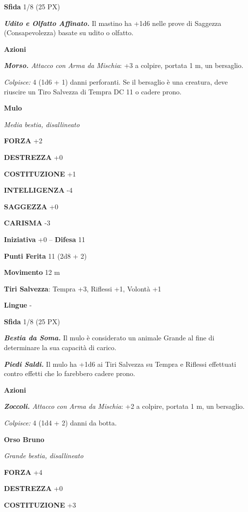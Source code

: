 \begin{multicols}{2}
	\textbf{Sfida} 1/8 (25 PX)

	\textit{\textbf{Udito e Olfatto Affinato.}} Il mastino ha +1d6 nelle prove di Saggezza (Consapevolezza) basate su udito o olfatto.

	\textbf{Azioni}

	\textit{\textbf{Morso.} Attacco con Arma da Mischia}: +3 a colpire, portata 1 m, un bersaglio.

	\textit{Colpisce:} 4 (1d6 + 1) danni perforanti. Se il bersaglio è una creatura, deve riuscire un Tiro Salvezza di Tempra DC 11 o cadere prono.

	\medskip\textbf{Mulo}

	\textit{Media bestia, disallineato}

	\textbf{FORZA} +2

	\textbf{DESTREZZA} +0

	\textbf{COSTITUZIONE} +1

	\textbf{INTELLIGENZA} -4

	\textbf{SAGGEZZA} +0

	\textbf{CARISMA} -3

	\textbf{Iniziativa} +0 -- \textbf{Difesa} 11

	\textbf{Punti Ferita} 11 (2d8 + 2)

	\textbf{Movimento} 12 m

	\textbf{Tiri Salvezza}: Tempra +3, Riflessi +1, Volontà +1

	\textbf{Lingue} -

	\textbf{Sfida} 1/8 (25 PX)

	\textit{\textbf{Bestia da Soma.}} Il mulo è considerato un animale Grande al fine di determinare la sua capacità di carico.

	\textit{\textbf{Piedi Saldi.}} Il mulo ha +1d6 ai Tiri Salvezza su Tempra e Riflessi effettuati contro effetti che lo farebbero cadere prono.

	\textbf{Azioni}

	\textit{\textbf{Zoccoli.} Attacco con Arma da Mischia}: +2 a colpire, portata 1 m, un bersaglio.

	\textit{Colpisce:} 4 (1d4 + 2) danni da botta.

	\medskip\textbf{Orso Bruno}

	\textit{Grande bestia, disallineato}

	\textbf{FORZA} +4

	\textbf{DESTREZZA} +0

	\textbf{COSTITUZIONE} +3


\end{multicols}
